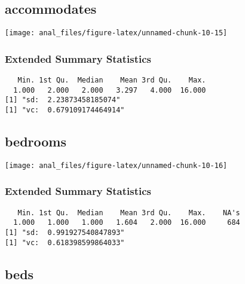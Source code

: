\hypertarget{accommodates}{%
\subsection{accommodates}\label{accommodates}}

\begin{center}\texttt{[image: anal\_files/figure-latex/unnamed-chunk-10-15]} \end{center}

\hypertarget{extended-summary-statistics-1}{%
\subsubsection{Extended Summary
Statistics}\label{extended-summary-statistics-1}}

\begin{verbatim}   Min. 1st Qu.  Median    Mean 3rd Qu.    Max. 
  1.000   2.000   2.000   3.297   4.000  16.000 
[1] "sd:  2.23873458185074"
[1] "vc:  0.679109174464914"
\end{verbatim}

\pagebreak

\hypertarget{bedrooms}{%
\subsection{bedrooms}\label{bedrooms}}

\begin{center}\texttt{[image: anal\_files/figure-latex/unnamed-chunk-10-16]} \end{center}

\hypertarget{extended-summary-statistics-2}{%
\subsubsection{Extended Summary
Statistics}\label{extended-summary-statistics-2}}

\begin{verbatim}   Min. 1st Qu.  Median    Mean 3rd Qu.    Max.    NA's 
  1.000   1.000   1.000   1.604   2.000  16.000     684 
[1] "sd:  0.991927540847893"
[1] "vc:  0.618398599864033"
\end{verbatim}

\pagebreak

\hypertarget{beds}{%
\subsection{beds}\label{beds}}

